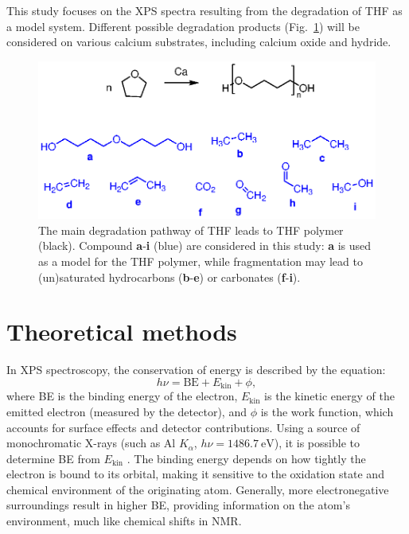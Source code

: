 \documentclass[12pt,a4paper]{article}
\begin{document}
This study focuses on the XPS spectra resulting from the degradation of THF as a model system. Different possible degradation products (Fig.~\ref{fig:THFdegradation}) will be considered on various calcium substrates, including calcium oxide and hydride.

\begin{figure}
	\centering
	\includegraphics{Figure1}
	\caption{The main degradation pathway of THF leads to THF polymer (black). Compound \textbf{a}-\textbf{i} (blue) are considered in this study: \textbf{a} is used as a model for the THF polymer, while fragmentation may lead to (un)saturated hydrocarbons (\textbf{b}-\textbf{e}) or carbonates (\textbf{f}-\textbf{i}).}
	\label{fig:THFdegradation}
\end{figure}

\section{Theoretical methods}

In XPS spectroscopy, the conservation of energy is described by the equation:
\begin{equation}
	h\nu = \text{BE} + E_{\text{kin}} + \phi, \label{eq:xps}
\end{equation}
where BE is the binding energy of the electron, $E_{\text{kin}}$ is the kinetic energy of the emitted electron (measured by the detector), and $\phi$ is the work function, which accounts for surface effects and detector contributions. Using a source of monochromatic X-rays (such as Al $K_\alpha$, $h\nu = \SI{1486.7}{\electronvolt}$), it is possible to determine BE from $E_{\text{kin}}$ \cite{vinesPredictionCoreLevel2018}. The binding energy depends on how tightly the electron is bound to its orbital, making it sensitive to the oxidation state and chemical environment of the originating atom. Generally, more electronegative surroundings result in higher BE, providing information on the atom's environment, much like chemical shifts in NMR.
\end{document}
